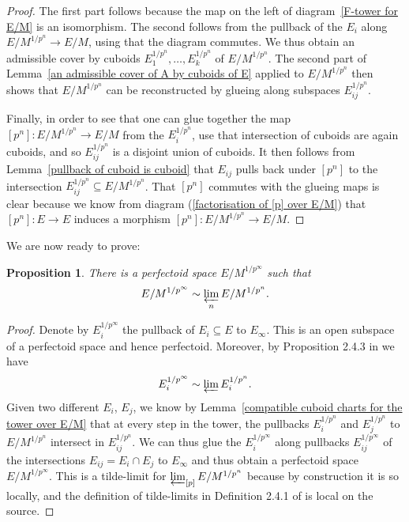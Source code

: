\documentclass[10pt,oneside]{amsart}
\newtheorem{proposition}[theorem]{Proposition}
\theoremstyle{definition}
\begin{document}
		\begin{proof}
		The first part follows because the map on the left of diagram~\ref{F-tower for E/M} is an isomorphism. The second follows from the pullback of the $E_i$ along $E/M^{1/p^n}\rightarrow E/M$, using that the diagram commutes.
		We thus obtain an admissible cover by cuboids $E_1^{1/p^n},\dots,E_k^{1/p^n}$ of $E/M^{1/p^n}$.
		The second part of Lemma~\ref{an admissible cover of A by cuboids of E} applied to $E/M^{1/p^n}$ then shows that $E/M^{1/p^n}$ can be reconstructed by glueing along subspaces $E_{ij}^{1/p^n}$.
		
		Finally, in order to see that one can glue together the map $[p^n]:E/M^{1/p^n}\rightarrow E/M$ from the $E_i^{1/p^n}$, use that intersection of cuboids are again cuboids, and so $E_{ij}^{1/p^n}$ is a disjoint union of cuboids. It then follows from Lemma~\ref{pullback of cuboid is cuboid} that $E_{ij}$ pulls back under $[p^n]$ to the intersection $E_{ij}^{1/p^n}\subseteq E/M^{1/p^n}$. That $[p^n]$ commutes with the glueing maps is clear because we know from diagram (\ref{factorisation of [p] over E/M}) that $[p^n]:E\rightarrow E$ induces a morphism $[p^n]:E/M^{1/p^n}\rightarrow E/M$.
		\end{proof}
		We are now ready to prove:
		\begin{proposition}\label{explicit construction of vertical tilde-limit}
			There is a perfectoid space $E/M^{1/p^\infty}$ such that\[E/M^{1/p^\infty}\sim \varprojlim_{n}E/M^{1/p^n}. \]
		\end{proposition}
		\begin{proof}
		 Denote by $E_i^{1/p^\infty}$ the pullback of $E_i\subseteq E$ to $E_\infty$. This is an open subspace of a perfectoid space and hence perfectoid. Moreover, by Proposition 2.4.3 in \cite{SW} we have  \[ E_i^{1/p^\infty}\sim \varprojlim E_i^{1/p^n}.\] 
		Given two different $E_i$, $E_j$, we know by Lemma~\ref{compatible cuboid charts for the tower over E/M} that at every step in the tower, the pullbacks $E_i^{1/p^n}$ and $E_j^{1/p^n}$ to $E/M^{1/p^n}$ intersect in  $E_{ij}^{1/p^n}$.
		We can thus glue the $E_i^{1/p^\infty}$ along pullbacks $E_{ij}^{1/p^\infty}$ of the intersections $E_{ij}=E_i\cap E_j$ to $E_\infty$ and thus obtain a perfectoid space $E/M^{1/p^\infty}$. This is a tilde-limit for $\varprojlim_{[p]}E/M^{1/p^n}$ because by construction it is so locally, and the definition of tilde-limits in Definition 2.4.1 of \cite{SW} is local on the source.
		\end{proof}
	 
\end{document}
